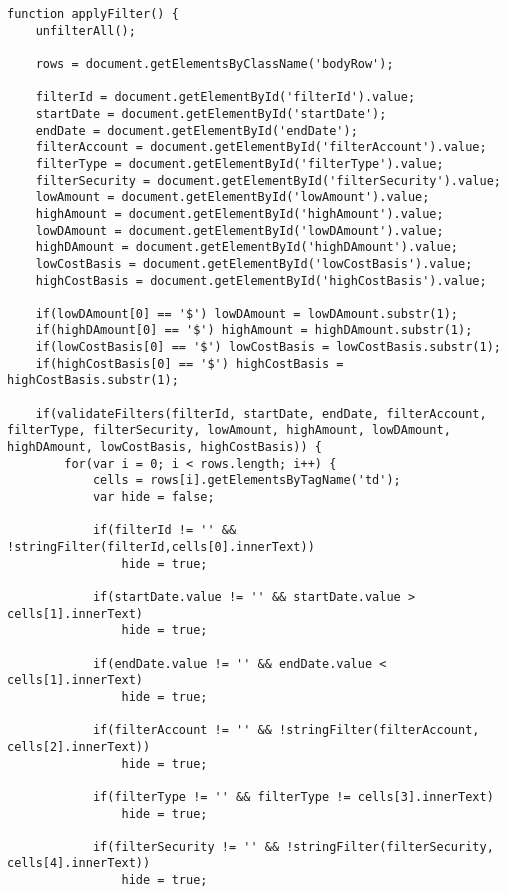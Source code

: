 \documentclass[letterpaper]{article}
\begin{document}
\begin{lstlisting}[firstnumber=512]
function applyFilter() {
    unfilterAll();

    rows = document.getElementsByClassName('bodyRow');

    filterId = document.getElementById('filterId').value;
    startDate = document.getElementById('startDate');
    endDate = document.getElementById('endDate');
    filterAccount = document.getElementById('filterAccount').value;
    filterType = document.getElementById('filterType').value;
    filterSecurity = document.getElementById('filterSecurity').value;
    lowAmount = document.getElementById('lowAmount').value;
    highAmount = document.getElementById('highAmount').value;
    lowDAmount = document.getElementById('lowDAmount').value;
    highDAmount = document.getElementById('highDAmount').value;
    lowCostBasis = document.getElementById('lowCostBasis').value;
    highCostBasis = document.getElementById('highCostBasis').value;

    if(lowDAmount[0] == '$') lowDAmount = lowDAmount.substr(1);
    if(highDAmount[0] == '$') highAmount = highDAmount.substr(1);
    if(lowCostBasis[0] == '$') lowCostBasis = lowCostBasis.substr(1);
    if(highCostBasis[0] == '$') highCostBasis = highCostBasis.substr(1);

    if(validateFilters(filterId, startDate, endDate, filterAccount, filterType, filterSecurity, lowAmount, highAmount, lowDAmount, highDAmount, lowCostBasis, highCostBasis)) {
        for(var i = 0; i < rows.length; i++) {
            cells = rows[i].getElementsByTagName('td');
            var hide = false;

            if(filterId != '' && !stringFilter(filterId,cells[0].innerText))
                hide = true;

            if(startDate.value != '' && startDate.value > cells[1].innerText)
                hide = true;

            if(endDate.value != '' && endDate.value < cells[1].innerText)
                hide = true;

            if(filterAccount != '' && !stringFilter(filterAccount, cells[2].innerText))
                hide = true;

            if(filterType != '' && filterType != cells[3].innerText)
                hide = true;

            if(filterSecurity != '' && !stringFilter(filterSecurity, cells[4].innerText))
                hide = true;


\end{lstlisting}
\end{document}
